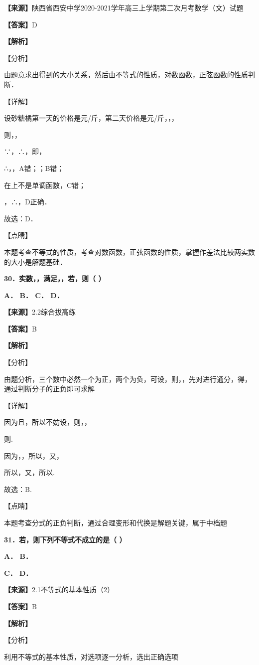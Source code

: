 \documentclass[
]{article}
\begin{document}
\textbf{【来源】}陕西省西安中学2020-2021学年高三上学期第二次月考数学（文）试题

\textbf{【答案】}D

\textbf{【解析】}

【分析】

由题意求出得到的大小关系，然后由不等式的性质，对数函数，正弦函数的性质判断．

【详解】

设砂糖橘第一天的价格是元/斤，第二天价格是元/斤，，，

则，，

∵，∴，即，

∴，，A错；；B错；

在上不是单调函数，C错；

，∴，D正确．

故选：D．

【点睛】

本题考查不等式的性质，考查对数函数，正弦函数的性质，掌握作差法比较两实数的大小是解题基础．

\textbf{30．实数，，满足，，若，则（ ）}

\textbf{A． B． C． D．}

\textbf{【来源】}2.2综合拔高练

\textbf{【答案】}B

\textbf{【解析】}

【分析】

由题分析，三个数中必然一个为正，两个为负，可设，则，，先对进行通分，得，通过判断分子的正负即可求解

【详解】

因为且，所以不妨设，则，，

则.

因为，，所以，又，

所以，又，所以.

故选：B.

【点睛】

本题考查分式的正负判断，通过合理变形和代换是解题关键，属于中档题

\textbf{31．若，则下列不等式不成立的是（ ）}

\textbf{A． B．}

\textbf{C． D．}

\textbf{【来源】}2.1不等式的基本性质（2）

\textbf{【答案】}B

\textbf{【解析】}

【分析】

利用不等式的基本性质，对选项逐一分析，选出正确选项
\end{document}
